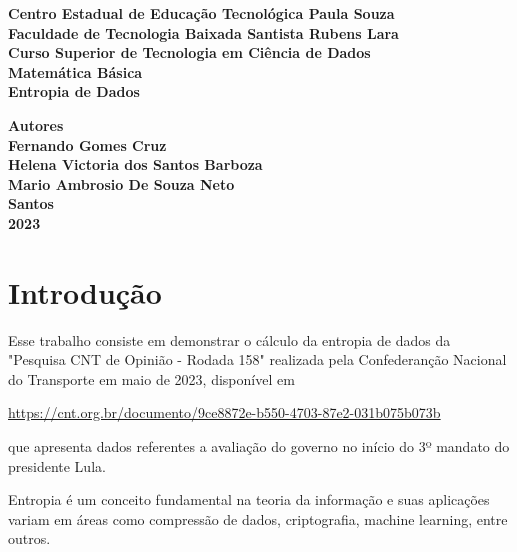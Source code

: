 \documentclass[12pt, a4paper]{article}
\begin{document}
\begin{titlepage}
\begin{center}
    \large
     {\bf Centro Estadual de Educação Tecnológica Paula Souza} \\
     {\bf Faculdade de Tecnologia Baixada Santista
Rubens Lara} \\ 
    {\bf Curso Superior de Tecnologia em Ciência de Dados} \\
    
    \vspace{215pt}
        {\bf Matemática Básica} \\
    \vspace{10pt}
        {\Large \bf Entropia de Dados}\\
        
    \vspace{100pt}

    \vfill
        {\large  \bf Autores} \\
        {\large  \bf Fernando Gomes Cruz} \\
        {\large \bf Helena Victoria dos Santos Barboza} \\
        {\large \bf Mario Ambrosio De Souza Neto} \\
    \vfill
        \textbf{{\large Santos}\\
        {\large 2023}}
        
\end{center}
\end{titlepage}

\tableofcontents

\newpage

\section{Introdução}

Esse trabalho consiste em demonstrar o cálculo da entropia de dados da "Pesquisa CNT de Opinião - Rodada 158" realizada pela Confederanção Nacional do Transporte em maio de 2023, disponível em 
\begin{center}
\url{ https://cnt.org.br/documento/9ce8872e-b550-4703-87e2-031b075b073b }
\end{center}
que apresenta dados referentes a avaliação do governo no início do 3º mandato do presidente Lula. 

Entropia é um conceito fundamental na teoria da informação e suas aplicações variam em áreas como compressão de dados, criptografia, machine learning, entre outros.
\end{document}
